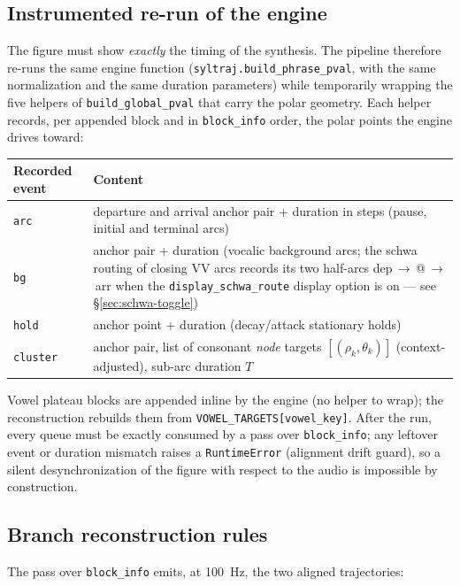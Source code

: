 \documentclass[11pt,a4paper]{article}
\newcommand{\code}[1]{\texttt{#1}}
\begin{document}
\subsection{Instrumented re-run of the engine}

The figure must show \emph{exactly} the timing of the synthesis. The
pipeline therefore re-runs the same engine function
(\code{syltraj.build\_phrase\_pval}, with the same normalization and
the same duration parameters) while temporarily wrapping the five
helpers of \code{build\_global\_pval} that carry the polar geometry.
Each helper records, per appended block and in
\code{block\_info} order, the polar points the engine drives toward:

\begin{center}
\begin{tabularx}{\textwidth}{@{}lX@{}}
\toprule
\textbf{Recorded event} & \textbf{Content} \\
\midrule
\code{arc} & departure and arrival anchor pair + duration in steps
(pause, initial and terminal arcs) \\
\code{bg} & anchor pair + duration (vocalic background arcs; the
schwa routing of closing VV arcs records its two half-arcs
dep\,$\to$\,@\,$\to$\,arr when the \code{display\_schwa\_route}
display option is on --- see \S\ref{sec:schwa-toggle}) \\
\code{hold} & anchor point + duration (decay/attack stationary
holds) \\
\code{cluster} & anchor pair, list of consonant \emph{node} targets
$[(\rho_k, \theta_k)]$ (context-adjusted), sub-arc duration $T$ \\
\bottomrule
\end{tabularx}
\end{center}

Vowel plateau blocks are appended inline by the engine (no helper to
wrap); the reconstruction rebuilds them from
\code{VOWEL\_TARGETS[vowel\_key]}. After the run, every queue must be
exactly consumed by a pass over \code{block\_info}; any leftover
event or duration mismatch raises a \code{RuntimeError} (alignment
drift guard), so a silent desynchronization of the figure with
respect to the audio is impossible by construction.

\subsection{Branch reconstruction rules}

The pass over \code{block\_info} emits, at 100~Hz, the two aligned
trajectories:
\end{document}
